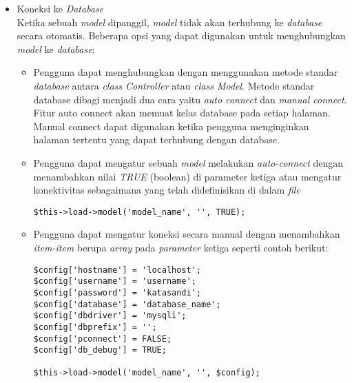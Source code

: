 \begin{itemize}
		\item Koneksi ke \textit{Database} \\
		Ketika sebuah \textit{model} dipanggil, \textit{model} tidak akan terhubung ke \textit{database} secara otomatis. Beberapa opsi yang dapat digunakan untuk menghubungkan \textit{model} ke \textit{database}:
		\begin{itemize}
			\item Pengguna dapat menghubungkan dengan menggunakan metode standar \textit{database} antara \textit{class Controller} atau \textit{class Model}. Metode standar database dibagi menjadi dua cara yaitu \textit{auto connect} dan \textit{manual connect}. Fitur auto connect akan memuat kelas database pada setiap halaman. Manual connect dapat digunakan ketika pengguna menginginkan halaman tertentu yang dapat terhubung dengan database.\\
			\item Pengguna dapat mengatur sebuah \textit{model} melakukan \textit{auto-connect} dengan menambahkan nilai \textit{TRUE} (boolean) di parameter ketiga atau mengatur konektivitas sebagaimana yang telah didefinisikan di dalam \textit{file} 
			\begin{lstlisting}[basicstyle=\ttfamily, frame=single,
columns=fullflexible, keepspaces=true, breaklines=true]
$this->load->model('model_name', '', TRUE);
\end{lstlisting}
			\item Pengguna dapat mengatur koneksi secara manual dengan menambahkan \textit{item-item} berupa \textit{array} pada \textit{parameter} ketiga seperti contoh berikut:
			\begin{lstlisting}[basicstyle=\ttfamily, frame=single,
columns=fullflexible, keepspaces=true, breaklines=true]
$config['hostname'] = 'localhost';
$config['username'] = 'username';
$config['password'] = 'katasandi';
$config['database'] = 'database_name';
$config['dbdriver'] = 'mysqli';
$config['dbprefix'] = '';
$config['pconnect'] = FALSE;
$config['db_debug'] = TRUE;
			
$this->load->model('model_name', '', $config);
\end{lstlisting}
		\end{itemize}
	\end{itemize}
	
